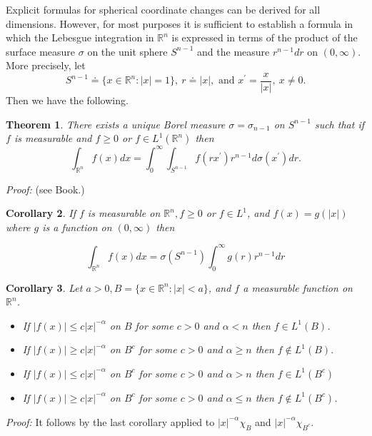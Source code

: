 \documentclass[12pt]{report}
\newtheorem{theorem}{Theorem}[section]
\newtheorem{corollary}[theorem]{Corollary}
\begin{document}
Explicit formulas for spherical coordinate changes
can be derived for all dimensions.  However, for most
purposes it is sufficient to establish a formula in
which the Lebesgue integration in $\mathbb{R}^n$ is
expressed in terms of the product of the surface
measure $\sigma$ on the unit sphere $S^{n-1}$ and the
measure $r^{n-1} dr$ on $(0, \infty)$.  More precisely,
let
\[
S^{n-1} \doteq \{x \in \mathbb{R}^n: |x| = 1\}, \ r
\doteq |x|, \mbox{ and } x^\prime = \frac{x}{|x|}, \ x
\ne 0.
\]
Then we have the following.

\begin{theorem}  There exists a unique Borel
measure $\sigma = \sigma_{n-1}$ on $S^{n-1}$ such
that if $f$ is measurable and $f \ge 0 $ or $f \in
L^1(\mathbb{R}^n)$ then
\[
\int_{\mathbb{R}^n} f(x) dx = \int^\infty_0
\int_{S^{n-1}} f(rx^\prime) r^{n-1} d \sigma
(x^\prime) dr.
\]
\end{theorem}
{\em Proof:}  (see Book.)

\begin{corollary}  If $f$ is measurable on
$\mathbb{R}^n, f \ge 0 $ or $f \in L^1$, and $f(x)
= g(|x|)$ where $g$ is a function on $(0, \infty)$ then

\[
\int_{\mathbb{R}^n} f(x) dx = \sigma (S^{n-1})
\int^\infty_0 g(r) r^{n-1} dr
\]
\end{corollary}

\begin{corollary} Let $a > 0, B = \{x \in
\mathbb{R}^n: |x| < a\}$, and $f$ a measurable function
on $\mathbb{R}^n$.

\begin{itemize}
\item[(a)]  If $|f(x)| \le c|x|^{- \alpha}$ on $B$ for some
$c > 0$ and $\alpha < n$ then $f \in L^1 (B)$.
\item[(b)]  If $|f(x)| \ge c|x|^{- \alpha}$ on $B^c$ for
some $c > 0 $ and $\alpha \ge n$ then $f \notin
L^1(B).$ 
\item[(c)]  If $|f(x)| \le c|x|^{- \alpha}$ on $B^c$ for
some $c > 0 $ and $\alpha > n $ then $f \in L^1(B^c)$
\item[(d)]  If $|f(x)| \ge c|x|^{- \alpha}$ on $B^c$ for
some $c > 0 $ and $\alpha \le n $ then $f \notin L^1
(B^c)$.
\end{itemize}
\end{corollary}

\vspace{.25cm}
\noindent
{\em Proof:}  It follows by the last corollary
applied to $|x|^{- \alpha} \chi_B$ and $|x|^{-\alpha}
\chi_{B^c}$.
\end{document}
